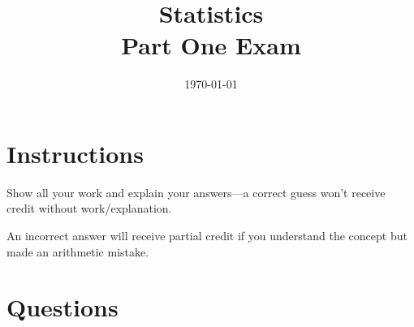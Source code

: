 \documentclass[letterpaper, landscape]{exam}
\title{Statistics \\ Part One Exam}
\date{\today}
\author{}
\begin{document}
  \maketitle


  \section{Instructions}
  Show all your work and explain your answers---a correct guess won't receive credit without
  work/explanation. 
  
  An incorrect answer will receive partial credit if you understand the
  concept but made an arithmetic mistake.

  \section{Questions}
\end{document}
